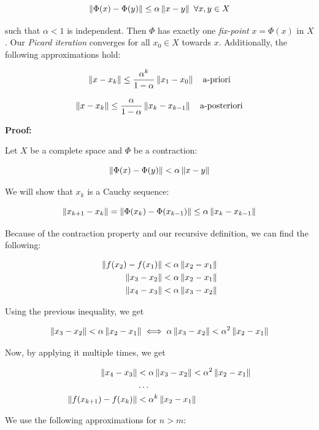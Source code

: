 \[
    \left\| \Phi(x) - \Phi(y) \right\| \le \alpha \left\| x - y \right\| \ \forall x,y \in X
\]

such that \(\alpha < 1\) is independent. Then \(\Phi\) has exactly one \emph{fix-point} \(x = \Phi(x)\) in \(X\). Our
\emph{Picard iteration} converges for all \(x_0 \in X\) towards \(x\). Additionally, the following approximations hold:

\[
    \left\| x - x_k \right\| \le \frac{\alpha^k}{1 - \alpha} \left\| x_1 - x_0 \right\| \quad \text{a-priori}
\]

\[
    \left\| x - x_k \right\| \le \frac{\alpha}{1 - \alpha} \left\| x_k - x_{k - 1} \right\| \quad \text{a-posteriori}
\]

\textbf{Proof:}

Let \(X\) be a complete space and \(\Phi\) be a contraction: 

\[
    \left\| \Phi(x) - \Phi(y) \right\| < \alpha \left\| x - y \right\|
\]

We will show that \(x_k\) is a Cauchy sequence:

\[
    \left\| x_{k + 1} - x_k \right\| = \left\| \Phi(x_k) - \Phi(x_{k - 1}) \right\| \le \alpha \left\| x_k - x_{k - 1} \right\|
\]

Because of the contraction property and our recursive definition, we can find the following:

\begin{align*}
    \left\| f(x_2) - f(x_1) \right\| &< \alpha\left\| x_2 - x_1 \right\| \\ 
    \left\| x_3 - x_2 \right\| &< \alpha\left\| x_2 - x_1 \right\| \\ 
    \left\| x_4 - x_3 \right\| &< \alpha \left\| x_3 - x_2 \right\| 
\end{align*}

Using the previous inequality, we get

\[
    \left\| x_3 - x_2 \right\| < \alpha\left\| x_2 - x_1 \right\| \iff \alpha \left\| x_3 - x_2 \right\| < \alpha^2\left\| x_2 - x_1 \right\| 
\]

Now, by applying it multiple times, we get 

\begin{align*} 
    \left\| x_4 - x_3 \right\| &< \alpha \left\| x_3 - x_2 \right\| < \alpha^2 \left\| x_2 - x_1 \right\|\\ 
    &\dots \\ 
    \left\| f(x_{k + 1}) - f(x_{k}) \right\| &< \alpha^k \left\| x_2 - x_1 \right\| \\ 
\end{align*}

We use the following approximations for \(n > m\):

